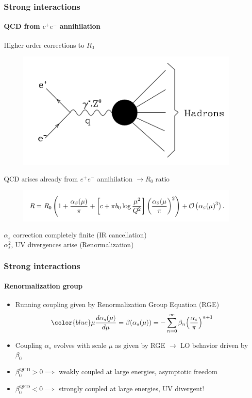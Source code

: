 \documentclass[aspectratio=43]{beamer}
\begin{document}
\begin{frame}

	\frametitle{Strong interactions}
	\framesubtitle{QCD from $e^{+}e^{-}$ annihilation}
	
	Higher order corrections to $R_{0}$ 
	\begin{figure}
		\includegraphics[width = 5 cm]{plots/ee_hadrons.png}
	\end{figure}
	
	QCD arises already from $e^{+}e^{-}$ annihilation $\rightarrow R_{0}$ ratio
	
	\begin{figure}
		\includegraphics[width = 8 cm]{plots/eq_R0_3.png}
	\end{figure}

	\footnotesize $\alpha_{s}$ correction completely finite (IR cancellation) \\
	\footnotesize $\alpha_{s}^{2}$, UV divergences arise (Renormalization)
	
\end{frame}

\begin{frame}

	\frametitle{Strong interactions}
	\framesubtitle{Renormalization group}
	
	\begin{itemize}
		\item Running coupling given by Renormalization Group Equation (RGE)
		\begin{equation}
			{\color{blue}\mu\frac{d\alpha_{s}(\mu)}{d\mu} = \beta(\alpha_{s}(\mu)) = -\sum_{n = 0}^{\infty} \beta_{n} \Big( \frac{\alpha_{s}}{\pi} \Big)^{n + 1}} \nonumber
		\end{equation}
		\item Coupling {\color{blue}$\alpha_{s}$} evolves with scale {\color{blue}$\mu$} as given by RGE $\rightarrow$ LO behavior driven by $\beta_{0}$
		\item $\beta_{0}^{\textrm{QCD}} > 0 \implies$ weakly coupled at large energies, asymptotic freedom
		\item $\beta_{0}^{\textrm{QED}} < 0 \implies$ strongly coupled at large energies, UV divergent!	
	\end{itemize}

\end{frame}
\end{document}
